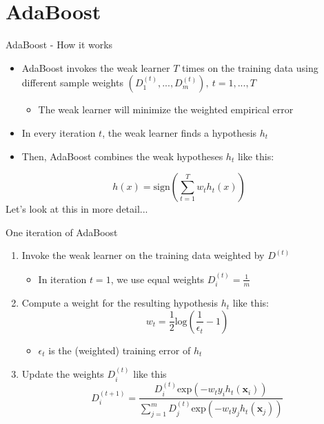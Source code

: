 \section{AdaBoost}

\begin{frame}{AdaBoost - How it works}
    \begin{itemize} \pause
        \item AdaBoost invokes the weak learner $T$ times
            on the training data using different sample weights
            $(D_1^{(t)}, ..., D_m^{(t)}), \  t=1, ..., T$ \pause
        \begin{itemize}
            \item The weak learner will minimize the weighted empirical error \pause
        \end{itemize}
        \item In every iteration $t$, the weak learner finds a hypothesis $h_t$ \pause
        \item Then, AdaBoost combines the weak hypotheses $h_t$ like this:
    \end{itemize}
    \begin{equation*}
        h(x) = \text{sign}\left( \sum_{t=1}^T w_t h_t(x) \right)
    \end{equation*} \pause
    Let's look at this in more detail...
\end{frame}

\begin{frame}{One iteration of AdaBoost}
    \begin{enumerate} \pause
        \item Invoke the weak learner on the training data weighted by $D^{(t)}$
        \begin{itemize}
            \item In iteration $t=1$, we use equal weights $D_i^{(t)}=\frac{1}{m}$
        \end{itemize} \pause
        \item Compute a weight for the resulting hypothesis $h_t$ like this:
        \begin{equation*}
            w_t = \frac{1}{2} \text{log} \left( \frac{1}{\epsilon_t} - 1 \right)
        \end{equation*}
        \begin{itemize}
            \item $\epsilon_t$ is the (weighted) training error of $h_t$ \pause
        \end{itemize}
        \item Update the weights $D_i^{(t)}$ like this
        \begin{equation*}
            D_i^{(t+1)} = \frac{D_i^{(t)} \text{exp} \left( -w_t y_i h_t(\mathbf{x}_i) \right)}{
        \sum_{j=1}^m D_j^{(t)} \text{exp} \left( -w_t y_j h_t(\mathbf{x}_j) \right) }
        \end{equation*}
    \end{enumerate}
\end{frame}

